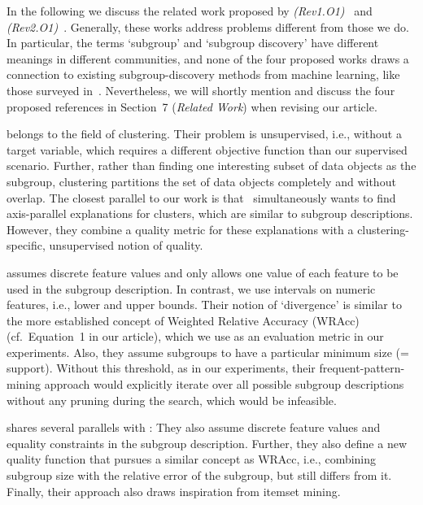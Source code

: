 \documentclass{article}
\begin{document}
In the following we discuss the related work proposed by \emph{(Rev1.O1)}~\cite{lawless2022interpretable, pastor2021looking} and \emph{(Rev2.O1)}~\cite{sagadeeva2021sliceline, asudeh2019assessing}.
Generally, these works address problems different from those we do.
In particular, the terms `subgroup' and `subgroup discovery' have different meanings in different communities, and none of the four proposed works draws a connection to existing subgroup-discovery methods from machine learning, like those surveyed in~\cite{atzmueller2015subgroup}.
Nevertheless, we will shortly mention and discuss the four proposed references in Section~7 (\emph{Related Work}) when revising our article.

\cite{lawless2022interpretable} belongs to the field of clustering.
Their problem is unsupervised, i.e., without a target variable, which requires a different objective function than our supervised scenario.
Further, rather than finding one interesting subset of data objects as the subgroup, clustering partitions the set of data objects completely and without overlap.
The closest parallel to our work is that \cite{lawless2022interpretable}~simultaneously wants to find axis-parallel explanations for clusters, which are similar to subgroup descriptions.
However, they combine a quality metric for these explanations with a clustering-specific, unsupervised notion of quality.

\cite{pastor2021looking} assumes discrete feature values and only allows one value of each feature to be used in the subgroup description.
In contrast, we use intervals on numeric features, i.e., lower and upper bounds.
Their notion of `divergence' is similar to the more established concept of Weighted Relative Accuracy (WRAcc)~\cite{lavravc1999rule} (cf.~Equation~1 in our article), which we use as an evaluation metric in our experiments.
Also, they assume subgroups to have a particular minimum size (= support).
Without this threshold, as in our experiments, their frequent-pattern-mining approach would explicitly iterate over all possible subgroup descriptions without any pruning during the search, which would be infeasible.

\cite{sagadeeva2021sliceline} shares several parallels with \cite{pastor2021looking}:
They also assume discrete feature values and equality constraints in the subgroup description.
Further, they also define a new quality function that pursues a similar concept as WRAcc, i.e., combining subgroup size with the relative error of the subgroup, but still differs from it.
Finally, their approach also draws inspiration from itemset mining. 
\end{document}
